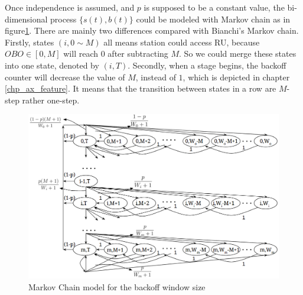 Once independence is assumed, and $p$ is supposed to be a constant value, the bi-dimensional process $\lbrace s(t),b(t) \rbrace$ could be modeled with Markov chain as in figure\ref{Markov}. 
There are mainly two differences compared with Bianchi's Markov chain.
Firstly, states $( i,0\sim M )$ all means station could access RU, because $OBO \in [0,M]$ will reach $0$ after subtracting $M$.
So we could merge these states into one state, denoted by $( i, T )$. 
Secondly, when a stage begins, the backoff counter will decrease the value of $M$, instead of $1$, which is depicted in chapter \ref{chp_ax_feature}.
It means that the transition between states in a row are $M$-step rather one-step.

\begin{figure}[!t]
    \centering
\includegraphics[scale=.4]{./figure/chp3/Markov_chain.png}
\caption{Markov Chain model for the backoff window size}
\label{Markov}
\end{figure}

